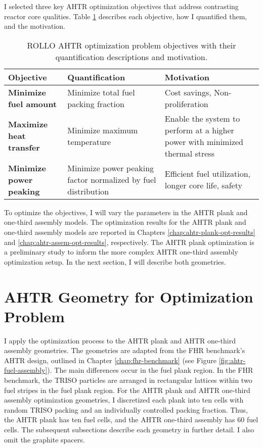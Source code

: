 I selected three key \gls{AHTR} optimization objectives that address contrasting reactor 
core qualities. 
Table \ref{tab:objectives} describes each objective, how I quantified them, and the motivation.
\begin{table}[htbp]
    \centering
    \onehalfspacing
    \caption{\acrfull{ROLLO} \acrfull{AHTR} optimization problem objectives with 
    their quantification descriptions and motivation.}
	\label{tab:objectives}
    \footnotesize
    \begin{tabular}{p{4.5cm}|p{5cm}p{5cm}}
    \hline 
    \textbf{Objective}& \textbf{Quantification}& \textbf{Motivation} \\
    \hline
    \textbf{Minimize fuel amount} & Minimize total fuel packing fraction 
    & Cost savings, Non-proliferation \\ 
    \hline
    \textbf{Maximize heat transfer} & Minimize maximum temperature 
    & Enable the system to perform at a higher power with minimized thermal stress \\
    \hline
    \textbf{Minimize power peaking} & Minimize power peaking factor normalized by fuel distribution 
    & Efficient fuel utilization, longer core life, safety\\
    \hline
    \end{tabular}
\end{table}

To optimize the objectives, I will vary the parameters in the \gls{AHTR} plank and 
one-third assembly models. 
The optimization results for the \gls{AHTR} plank and one-third assembly models are 
reported in Chapters \ref{chap:ahtr-plank-opt-results} and \ref{chap:ahtr-assem-opt-results}, 
respectively. 
The \gls{AHTR} plank optimization is a preliminary study to inform the more complex 
\gls{AHTR} one-third assembly optimization setup. 
In the next section, I will describe both geometries. 

\section{AHTR Geometry for Optimization Problem}
I apply the optimization process to the \gls{AHTR} plank and \gls{AHTR} one-third
assembly geometries.
The geometries are adapted from the \gls{FHR} benchmark's \gls{AHTR} design,
outlined in Chapter \ref{chap:fhr-benchmark} (see Figure \ref{fig:ahtr-fuel-assembly}).
The main differences occur in the fuel plank region. 
In the \gls{FHR} benchmark, the TRISO particles are arranged in rectangular lattices 
within two fuel stripes in the fuel plank region. 
For the \gls{AHTR} plank and \gls{AHTR} one-third assembly optimization geometries, 
I discretized each plank into ten cells with random TRISO packing and an individually 
controlled packing fraction. 
Thus, the \gls{AHTR} plank has ten fuel cells, and the \gls{AHTR} one-third assembly 
has 60 fuel cells.  
The subsequent subsections describe each geometry in further detail.
I also omit the graphite spacers. 


